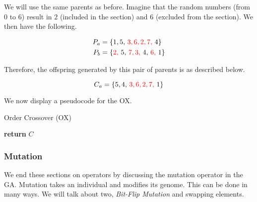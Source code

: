 We will use the same parents as before. Imagine that the random numbers (from $0$ to $6$) result in $2$ (included in the section) and $6$ (excluded from the section). We then have the following.

\begin{align}
    P_{a} &= \color{black}{ \{ 1, 5,\ } \color{red}{3, 6, 2, 7,\ } \color{black}{4} \}\\
    P_{b} &= \color{black}{\{} \color{red}{2,\ } \color{black}{5,\ } \color{red}{7, 3,\ } \color{black}{4,\ } \color{red}{6,\ } \color{black}{1} \}
\end{align}

Therefore, the offspring generated by this pair of parents is as described below.

\begin{equation}
    C_{a} = \color{black}{\{ 5, 4,\ } \color{red}{3, 6, 2, 7,\ } \color{black}{1 \}}
\end{equation}

We now display a pseudocode for the OX.

\begin{algorithm}[H]
    \caption{Order Crossover (OX)}
    \begin{algorithmic}[1]
            \EndIf
                    \EndIf
                \EndFor
            \EndIf
            \State \textbf{return} $C$
        \EndProcedure
    \end{algorithmic}
\end{algorithm}


\subsubsection{Mutation}

We end these sections on operators by discussing the mutation operator in the GA. Mutation takes an individual and modifies its genome. This can be done in many ways. We will talk about two, \textit{Bit-Flip Mutation} and swapping elements.

